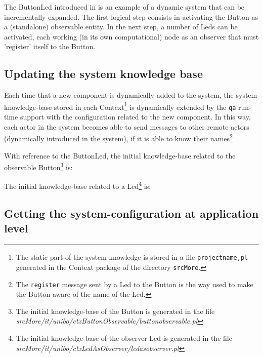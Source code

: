 The ButtonLed introduced in  is an example of a dynamic system that can be incrementally expanded. The first logical step consists in activating the Button as a (standalone) observable entity. In the next step, a number of Leds  can be activated, each working (in its own computational) node as an observer that must 'register' itself to the Button. 


\subsection{Updating the system knowledge base}

Each time that a new component is dynamically added to the system, the system knowledge-base stored in each Context\footnote{The static part of the system knowledge is stored in a file \texttt{projectname,pl} generated  in the Context package of the directory \texttt{srcMore}.} is dynamically extended by the \texttt{qa} run-time support with the configuration 	related to the new component.
%
In this way, each actor in the system becomes able to send messages to other remote actors (dynamically introduced in the system), if it is able to know their names\footnote{The \texttt{register} message sent by a Led to the Button is the way used to make the Button aware of the name of the Led.} 

With reference to the ButtonLed, the initial knowledge-base related to the observable Button\footnote{The initial knowledge-base of the Button is generated in the file \textit{srcMore/it/unibo/ctxButtonObservable/buttonobservable.pl}}  is: 




The initial knowledge-base related to a Led\footnote{The initial knowledge-base of the observer Led is generated in the file \textit{srcMore/it/unibo/ctxLedAsObserver/ledasobserver.pl}} is:




\subsection{Getting the system-configuration at application level}

